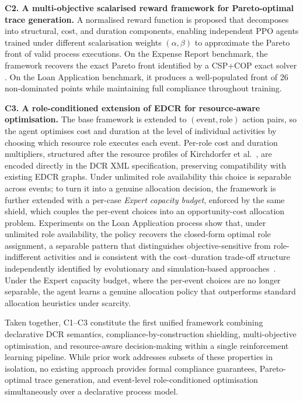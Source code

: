 \textbf{C2.\label{cont:c2} A multi-objective scalarised reward framework for Pareto-optimal trace generation.}
A normalised reward function is proposed that decomposes into
structural, cost, and duration components, enabling independent \ac{PPO}
agents trained under different scalarisation weights $(\alpha, \beta)$
\cite{DasNormalBoundaryIntersection1998}
to approximate the Pareto front of valid process executions.
On the Expense Report benchmark, the framework recovers the exact Pareto
front identified by a CSP+COP exact solver \cite{Diaz2024Pareto-OptimalModels}.
On the Loan Application benchmark, it produces a well-populated front of
26 non-dominated points while maintaining full compliance throughout
training.

\textbf{C3.\label{cont:c3} A role-conditioned extension of \ac{EDCR} for
resource-aware optimisation.}
The base framework is extended to $(\text{event}, \text{role})$ action
pairs, so the agent optimises cost and duration at the level of
individual activities by choosing which resource role executes each
event. Per-role cost and duration multipliers, structured after the
resource profiles of Kirchdorfer et
al.~\cite{KirchdorferLukasFromPolicies}, are encoded directly in the
\ac{DCR} XML specification, preserving compatibility with existing
\ac{EDCR} graphs. Under unlimited role availability this choice is
separable across events; to turn it into a genuine allocation decision,
the framework is further extended with a per-case \emph{Expert capacity
budget}, enforced by the same shield, which couples the per-event
choices into an opportunity-cost allocation problem. Experiments on the Loan Application process show that, under unlimited role availability, the policy recovers the closed-form optimal role assignment, a separable pattern that distinguishes objective-sensitive
from role-indifferent activities and is consistent with the cost--duration trade-off structure independently identified by evolutionary and simulation-based
approaches~\cite{KirchdorferLukasFromPolicies,
ArtemisDoumeniParetoAgentSimulator}. Under the Expert capacity budget, where the per-event choices are no longer separable, the agent learns a genuine allocation policy that outperforms standard allocation
heuristics under scarcity.

Taken together, C1--C3 constitute the first unified framework combining
declarative \ac{DCR} semantics, compliance-by-construction shielding,
multi-objective optimisation, and resource-aware decision-making within
a single reinforcement learning pipeline.
While prior work addresses subsets of these properties in isolation, no
existing approach provides formal compliance guarantees, Pareto-optimal
trace generation, and event-level role-conditioned optimisation simultaneously
over a declarative process model.

